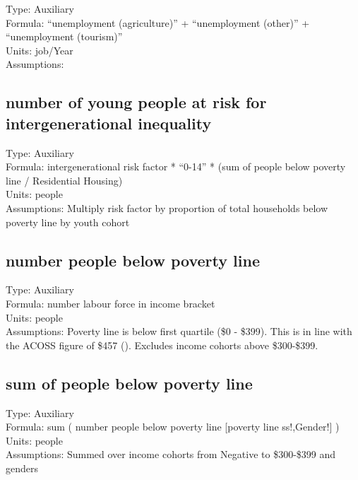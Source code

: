 \documentclass[
  11pt,
]{book}
\begin{document}
Type: Auxiliary\\
Formula: ``unemployment (agriculture)'' + ``unemployment (other)'' + ``unemployment (tourism)''\\
Units: job/Year\\
Assumptions:

\hypertarget{number-of-young-people-at-risk-for-intergenerational-inequality}{%
\subsection{number of young people at risk for intergenerational inequality}\label{number-of-young-people-at-risk-for-intergenerational-inequality}}

Type: Auxiliary\\
Formula: intergenerational risk factor * ``0-14'' * (sum of people below poverty line / Residential Housing)\\
Units: people\\
Assumptions: Multiply risk factor by proportion of total households below poverty line by youth cohort

\hypertarget{number-people-below-poverty-line}{%
\subsection{number people below poverty line}\label{number-people-below-poverty-line}}

Type: Auxiliary\\
Formula: number labour force in income bracket\\
Units: people\\
Assumptions: Poverty line is below first quartile (\$0 - \$399). This is in line with the ACOSS figure of \$457 (\citet{acoss_poverty_2020}). Excludes income cohorts above \$300-\$399.

\hypertarget{sum-of-people-below-poverty-line}{%
\subsection{sum of people below poverty line}\label{sum-of-people-below-poverty-line}}

Type: Auxiliary\\
Formula: sum ( number people below poverty line {[}poverty line ss!,Gender!{]} )\\
Units: people\\
Assumptions: Summed over income cohorts from Negative to \$300-\$399 and genders
\end{document}
